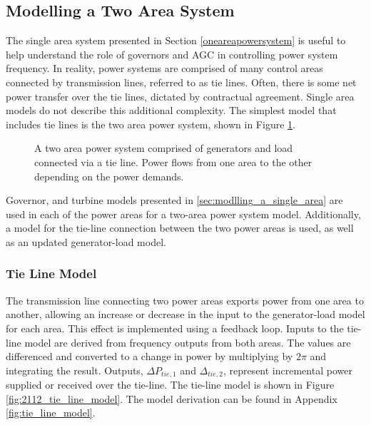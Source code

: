\subsection{Modelling a Two Area System} \label{ssec:modelling_two_area_system}
The single area system presented in Section \ref{oneareapowersystem} is useful to help understand the role of governors and AGC in controlling power system frequency. In reality, power systems are comprised of many control areas connected by transmission lines, referred to as tie lines. Often, there is some net power transfer over the tie lines, dictated by contractual agreement. Single area models do not describe this additional complexity. The simplest model that includes tie lines is the two area power system, shown in Figure \ref{fig:2111_two_area_system}.

\begin{figure}[h]
	\centering
	\resizebox{12cm}{!}{}
	\caption[Overview of two area power system with tie line]{A two area power system comprised of generators and load connected via a tie line. Power flows from one area to the other depending on the power demands.}
	\label{fig:2111_two_area_system}
\end{figure}

Governor, and turbine models presented in \textsection \ref{sec:modlling_a_single_area} are used in each of the power areas for a two-area power system model. Additionally, a model for the tie-line connection between the two power areas is used, as well as an updated generator-load model. 

\subsubsection{Tie Line Model}\label{sec:tie_line_model}
The transmission line connecting two power areas exports power from one area to another, allowing an increase or decrease in the input to the generator-load model for each area. This effect is implemented using a feedback loop. Inputs to the tie-line model are derived from frequency outputs from both areas. The values are differenced and converted to a change in power by multiplying by $2\pi$ and integrating the result. Outputs, $\Delta P_{tie,1}$ and $\Delta_{tie,2}$, represent incremental power supplied or received over the tie-line. The tie-line model is shown in Figure \ref{fig:2112_tie_line_model}. The model derivation can be found in Appendix \ref{fig:tie_line_model}.

